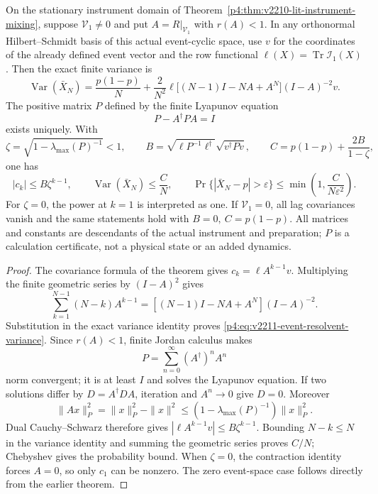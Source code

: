 \documentclass[12pt,a4paper]{article}
\begin{document}
\begin{corollary}
\label{p4:cor:v2211-finite-event-resolvent-certificate}
On the stationary instrument domain of
Theorem~\ref{p4:thm:v2210-lit-instrument-mixing}, suppose
\(\mathcal V_1\ne0\) and put \(A=R|_{\mathcal V_1}\) with \(r(A)<1\).
In any orthonormal Hilbert--Schmidt basis of this actual event-cyclic
space, use \(v\) for the coordinates of the already defined event vector
and the row functional
\(\ell(X)=\operatorname{Tr}\mathcal I_1(X)\).  Then the exact finite
variance is
\begin{equation}
 \boxed{
 \operatorname{Var}(\bar X_N)=\frac{p(1-p)}N+
 \frac2{N^2}\ell\bigl[(N-1)I-NA+A^N\bigr](I-A)^{-2}v.}
 \label{p4:eq:v2211-event-resolvent-variance}
\end{equation}
The positive matrix \(P\) defined by the finite Lyapunov equation
\[
 P-A^\dagger PA=I
\]
exists uniquely.  With
\[
 \zeta=\sqrt{1-\lambda_{\max}(P)^{-1}}<1,\qquad
 B=\sqrt{\ell P^{-1}\ell^\dagger}\sqrt{v^\dagger Pv},\qquad
 C=p(1-p)+\frac{2B}{1-\zeta},
\]
one has
\begin{equation}
 |c_k|\le B\zeta^{k-1},\qquad
 \operatorname{Var}(\bar X_N)\le\frac CN,\qquad
 \Pr\{|\bar X_N-p|>\varepsilon\}
 \le\min\!\left(1,\frac C{N\varepsilon^2}\right).
 \label{p4:eq:v2211-computable-frequency-error}
\end{equation}
For \(\zeta=0\), the power at \(k=1\) is interpreted as one.  If
\(\mathcal V_1=0\), all lag covariances vanish and the same statements
hold with \(B=0,\ C=p(1-p)\).  All matrices and constants are descendants
of the actual instrument and preparation; \(P\) is a calculation
certificate, not a physical state or an added dynamics.
\end{corollary}
\begin{proof}
The covariance formula of the theorem gives \(c_k=\ell A^{k-1}v\).
Multiplying the finite geometric series by \((I-A)^2\) gives
\[
 \sum_{k=1}^{N-1}(N-k)A^{k-1}
 =[(N-1)I-NA+A^N](I-A)^{-2}.
\]
Substitution in the exact variance identity proves
\eqref{p4:eq:v2211-event-resolvent-variance}.  Since \(r(A)<1\),
finite Jordan calculus makes
\[
 P=\sum_{n=0}^{\infty}(A^\dagger)^nA^n
\]
norm convergent; it is at least \(I\) and solves the Lyapunov equation.
If two solutions differ by \(D=A^\dagger DA\), iteration and \(A^n\to0\)
give \(D=0\).  Moreover
\[
 \|Ax\|_P^2=\|x\|_P^2-\|x\|^2
 \le(1-\lambda_{\max}(P)^{-1})\|x\|_P^2.
\]
Dual Cauchy--Schwarz therefore gives
\(|\ell A^{k-1}v|\le B\zeta^{k-1}\).
Bounding \(N-k\le N\) in the variance identity and summing the geometric
series proves \(C/N\); Chebyshev gives the probability bound.  When
\(\zeta=0\), the contraction identity forces \(A=0\), so only \(c_1\)
can be nonzero.  The zero event-space case follows directly from the
earlier theorem.
\end{proof}
\end{document}
